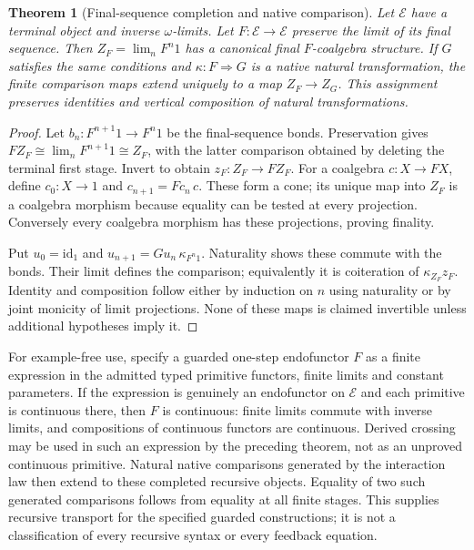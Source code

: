 \documentclass[11pt]{article}
\newtheorem{theorem}{Theorem}\newtheorem{proposition}{Proposition}
\begin{document}
\begin{theorem}[Final-sequence completion and native comparison]
Let $\mathcal E$ have a terminal object and inverse $\omega$-limits. Let $F:\mathcal E\to\mathcal E$ preserve the limit of its final sequence. Then $Z_F=\lim_nF^n1$ has a canonical final $F$-coalgebra structure. If $G$ satisfies the same conditions and $\kappa:F\Rightarrow G$ is a native natural transformation, the finite comparison maps extend uniquely to a map $Z_F\to Z_G$. This assignment preserves identities and vertical composition of natural transformations.
\end{theorem}
\begin{proof}
Let $b_n:F^{n+1}1\to F^n1$ be the final-sequence bonds. Preservation gives $FZ_F\cong\lim_nF^{n+1}1\cong Z_F$, with the latter comparison obtained by deleting the terminal first stage. Invert to obtain $z_F:Z_F\to FZ_F$. For a coalgebra $c:X\to FX$, define $c_0:X\to1$ and $c_{n+1}=Fc_n\,c$. These form a cone; its unique map into $Z_F$ is a coalgebra morphism because equality can be tested at every projection. Conversely every coalgebra morphism has these projections, proving finality.

Put $u_0=\mathrm{id}_1$ and $u_{n+1}=G u_n\,\kappa_{F^n1}$. Naturality shows these commute with the bonds. Their limit defines the comparison; equivalently it is coiteration of $\kappa_{Z_F}z_F$. Identity and composition follow either by induction on $n$ using naturality or by joint monicity of limit projections. None of these maps is claimed invertible unless additional hypotheses imply it.
\end{proof}

For example-free use, specify a guarded one-step endofunctor $F$ as a finite expression in the admitted typed primitive functors, finite limits and constant parameters. If the expression is genuinely an endofunctor on $\mathcal E$ and each primitive is continuous there, then $F$ is continuous: finite limits commute with inverse limits, and compositions of continuous functors are continuous. Derived crossing may be used in such an expression by the preceding theorem, not as an unproved continuous primitive. Natural native comparisons generated by the interaction law then extend to these completed recursive objects. Equality of two such generated comparisons follows from equality at all finite stages. This supplies recursive transport for the specified guarded constructions; it is not a classification of every recursive syntax or every feedback equation.
\end{document}
